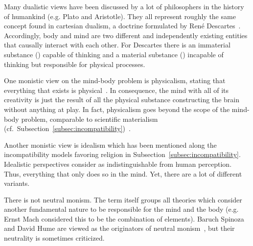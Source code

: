 Many dualistic views have been discussed by a lot of philosophers in the history of humankind (e.g. Plato and Aristotle).
They all represent roughly the same concept found in cartesian dualism, a doctrine formulated by René Descartes~\cite{Leach2017}.
Accordingly, body and mind are two different and independently existing entities that causally interact with each other.
For Descartes there is an immaterial substance () capable of thinking and a material substance () incapable of thinking but responsible for physical processes.


One monistic view on the mind-body problem is physicalism, stating that everything that exists is physical~\cite{stoljar2010physicalism}. In consequence, the mind with all of its creativity is just the result of all the physical substance constructing the brain without anything  at play.
In fact, physicalism goes beyond the scope of the mind-body problem, comparable to scientific materialism (cf.~Subsection~\ref{subsec:incompatibility})~\cite{Crane1990}.

Another monistic view is idealism which has been mentioned along the incompatibility models favoring religion in Subsection~\ref{subsec:incompatibility}.
Idealistic perspectives consider  as indistinguishable from human perception.
Thus, everything that  only does so in the mind.
Yet, there are a lot of different variants.

There is not  neutral monism. The term itself groups all theories which consider another fundamental nature to be responsible for the mind and the body (e.g. Ernst Mach considered this to be the combination of elements).
Baruch Spinoza and David Hume are viewed as the originators of neutral monism~\cite{rosenkrantz2010historical}, but their neutrality is sometimes criticized.

